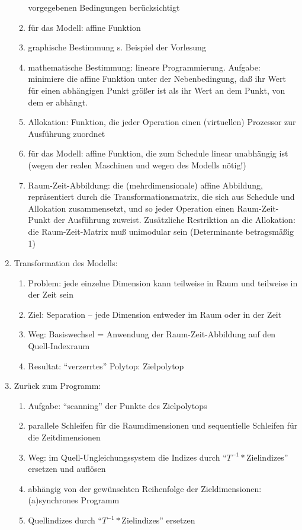\begin{enumerate}
\begin{enumerate}
  vorgegebenen Bedingungen berücksichtigt
\item für das Modell: affine Funktion
\item graphische Bestimmung s. Beispiel der Vorlesung
\item mathematische Bestimmung: lineare Programmierung. Aufgabe:
  minimiere die affine Funktion unter der Nebenbedingung, daß ihr Wert
  für einen abhängigen Punkt größer ist als ihr Wert an dem Punkt, von
  dem er abhängt.
\item Allokation: Funktion, die jeder Operation einen (virtuellen)
  Prozessor zur Ausführung zuordnet
\item für das Modell: affine Funktion, die zum Schedule linear
  unabhängig ist (wegen der realen Maschinen und wegen des Modells
  nötig!)
\item Raum-Zeit-Abbildung: die (mehrdimensionale) affine Abbildung,
  repräsentiert durch die Transformationsmatrix, die sich aus Schedule
  und Allokation zusammensetzt, und so jeder Operation einen
  Raum-Zeit-Punkt der Ausführung zuweist. Zusätzliche Restriktion an die 
  Allokation: die Raum-Zeit-Matrix muß unimodular sein (Determinante
  betragsmäßig 1)
\end{enumerate}
%
\item Transformation des Modells:
\begin{enumerate}
\item Problem: jede einzelne Dimension kann teilweise in Raum und
  teilweise in der Zeit sein
\item Ziel: Separation -- jede Dimension entweder im Raum oder in der Zeit
\item Weg: Basiswechsel = Anwendung der Raum-Zeit-Abbildung auf den
  Quell-Indexraum
\item Resultat: ``verzerrtes'' Polytop: Zielpolytop
\end{enumerate}
%
\item Zurück zum Programm:
\begin{enumerate}
\item Aufgabe: ``scanning'' der Punkte des Zielpolytops
\item parallele Schleifen für die Raumdimensionen und sequentielle
  Schleifen für die Zeitdimensionen
\item Weg: im Quell-Ungleichungssystem die Indizes durch
  ``$T^{-1}*$Zielindizes'' ersetzen und auflösen
\item abhängig von der gewünschten Reihenfolge der Zieldimensionen:
  (a)synchrones Programm
\item Quellindizes durch ``$T^{-1}*$Zielindizes'' ersetzen
\end{enumerate}
\end{enumerate}

